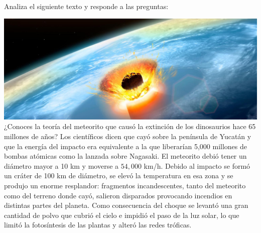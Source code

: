 \question Analiza el siguiente texto y responde a las preguntas:

\begin{boxE}
    \includegraphics[width=\linewidth]{../images/5582.jpg}
    ¿Conoces la teoría del meteorito que causó la extinción de los dinosaurios
    hace 65 millones de años? Los científicos dicen que cayó sobre la península
    de Yucatán y que la energía del impacto era equivalente a la que liberarían
    5,000 millones de bombas atómicas como la lanzada sobre Nagasaki. El
    meteorito debió tener un diámetro mayor a 10 km y moverse a $54,000$ km/h.
    Debido al impacto se formó un cráter de 100 km de diámetro, se elevó
    la temperatura en esa zona y se produjo un enorme resplandor: fragmentos
    incandescentes, tanto del meteorito como del terreno donde cayó, salieron
    disparados provocando incendios en distintas partes del planeta.
    Como consecuencia del choque se levantó una gran cantidad de polvo
    que cubrió el cielo e impidió el paso de la luz solar, lo que limitó la fotosíntesis de las plantas y alteró las redes tróficas.
\end{boxE}

\begin{parts}
    
    
    
\end{parts}
